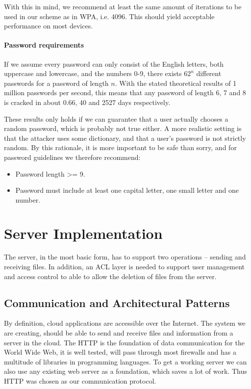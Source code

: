 \documentclass[pdftex,english,10pt,b5paper,twoside]{book}
\begin{document}
With this in mind, we recommend at least the same amount of iterations to be
used in our scheme as in \ac{WPA}, i.e. 4096. This should yield acceptable
performance on most devices. 

\paragraph{Password requirements}

If we assume every password can only consist of the English letters, both
uppercase and lowercase, and the numbers 0-9, there exists $62^n$ different
passwords for a password of length $n$. With the stated theoretical results of
1 million passwords per second, this means that any password of length 6, 7 and
8 is cracked in about 0.66, 40 and 2527 days respectively.

These results only holds if we can guarantee that a user actually chooses
a random password, which is probably not true either. A more realistic setting
is that the attacker uses some dictionary, and that a user's password is not
strictly random. By this rationale, it is more important to be safe than sorry,
and for password guidelines we therefore recommend:

\begin{itemize}
\item Password length >= 9.
\item Password must include at least one capital letter, one small letter and
one number.
\end{itemize}

\section{Server Implementation}

The server, in the most basic form, has to support two operations -- sending
and receiving files. In addition, an \ac{ACL} layer is needed to support user
management and access control to able to allow the deletion of files from the
server.

\subsection{Communication and Architectural Patterns}

By definition, cloud applications are accessible over the Internet. The system
we are creating, should be able to send and receive files and information from
a server in the cloud. The \acf{HTTP} is the foundation of data communication
for the World Wide Web, it is well tested, will pass through most firewalls and
has a multitude of libraries in programming languages. To get a working server
we can also use any existing web server as a foundation, which saves a lot of
work. Thus \ac{HTTP} was chosen as our communication protocol.
\end{document}
